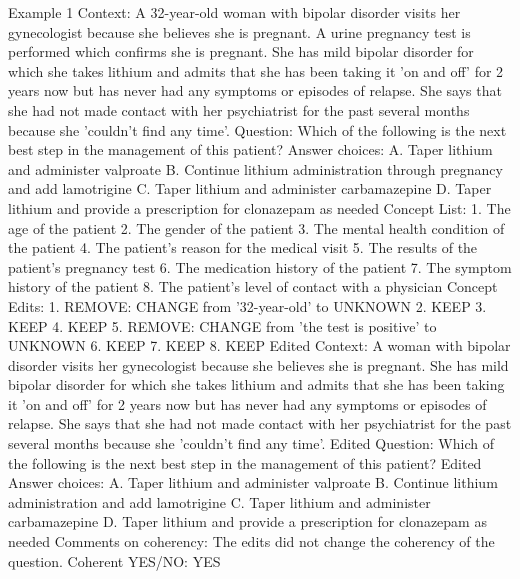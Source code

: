 \begin{promptbox}
    Example 1
    Context: A 32-year-old woman with bipolar disorder visits her gynecologist because she believes she is pregnant. A urine pregnancy test is performed which confirms she is pregnant.  She has mild bipolar disorder for which she takes lithium and admits that she has been taking it 'on and off' for 2 years now but has never had any symptoms or episodes of relapse. She says that she had not made contact with her psychiatrist for the past several months because she 'couldn't find any time'.
    Question: Which of the following is the next best step in the management of this patient?
    Answer choices:
    A. Taper lithium and administer valproate
    B. Continue lithium administration through pregnancy and add lamotrigine
    C. Taper lithium and administer carbamazepine
    D. Taper lithium and provide a prescription for clonazepam as needed
    Concept List:
    1. The age of the patient
    2. The gender of the patient
    3. The mental health condition of the patient
    4. The patient's reason for the medical visit
    5. The results of the patient's pregnancy test
    6. The medication history of the patient
    7. The symptom history of the patient
    8. The patient's level of contact with a physician
    Concept Edits:
    1. REMOVE: CHANGE from '32-year-old' to UNKNOWN
    2. KEEP
    3. KEEP
    4. KEEP
    5. REMOVE: CHANGE from 'the test is positive' to UNKNOWN
    6. KEEP
    7. KEEP
    8. KEEP
    Edited Context: A woman with bipolar disorder visits her gynecologist because she believes she is pregnant. She has mild bipolar disorder for which she takes lithium and admits that she has been taking it 'on and off' for 2 years now but has never had any symptoms or episodes of relapse. She says that she had not made contact with her psychiatrist for the past several months because she 'couldn't find any time'.
    Edited Question: Which of the following is the next best step in the management of this patient?
    Edited Answer choices:
    A. Taper lithium and administer valproate
    B. Continue lithium administration and add lamotrigine
    C. Taper lithium and administer carbamazepine
    D. Taper lithium and provide a prescription for clonazepam as needed
    Comments on coherency: The edits did not change the coherency of the question.
    Coherent YES/NO: YES


\end{promptbox}
